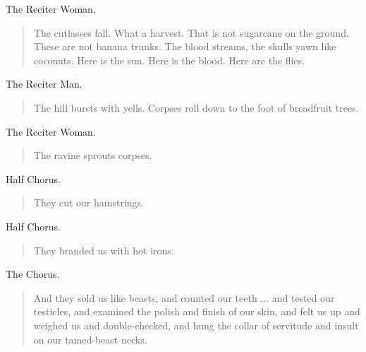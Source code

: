 \documentclass[letterpaper,article,12pt,oneside,notitlepage]{memoir}
\begin{document}
\begin{center}The Reciter Woman.\end{center}

\begin{verse}
\indent The cutlasses fall. What a harvest. That is not sugarcane on the ground. These are not banana trunks. The blood streams, the skulls yawn like coconuts. Here is the sun. Here is the blood. Here are the flies. \\
\end{verse}

\begin{center}The Reciter Man.\end{center}

\begin{verse}
\indent The hill bursts with yells. Corpses roll down to the foot of breadfruit trees. \\
\end{verse}

\begin{center}The Reciter Woman.\end{center}

\begin{verse}
\hspace{1cm} The ravine sprouts corpses. \\
\end{verse}

\begin{center}Half Chorus.\end{center}

\begin{verse}
\hspace{1cm} They cut our hamstrings. \\
\end{verse}

\begin{center}Half Chorus.\end{center}

\begin{verse}
\hspace{1cm} They branded us with hot irons. \\
\end{verse}

\begin{center}The Chorus.\end{center}

\begin{verse}
\indent And they sold us like beasts, and counted our teeth ... and tested our testicles, and examined the polish and finish of our skin, and felt us up and weighed us and double-checked, and hung the collar of servitude and insult on our tamed-beast necks. \\
\end{verse}
\end{document}
